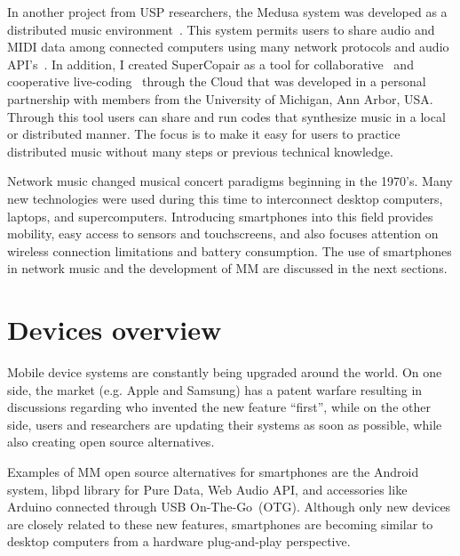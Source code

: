 In another project from USP researchers, the Medusa system was developed as a distributed music environment~\citep{Schiavoni2011medusa,Schiavoni2012network,Schiavoni2013network}.
This system permits users to share audio and MIDI data among connected computers using many network protocols and audio API's~\citep{Schiavoni2013thesis}.
In addition, I created SuperCopair as a tool for collaborative~\citep{deCarvalhoJunior2015supercopair} and cooperative live-coding~\citep{deCarvalhoJunior2015cooperative} through the Cloud that was developed in a personal partnership with members from the University of Michigan, Ann Arbor, USA.
Through this tool users can share and run codes that synthesize music in a local or distributed manner.
The focus is to make it easy for users to practice distributed music without many steps or previous technical knowledge.

Network music changed musical concert paradigms beginning in the 1970's.
Many new technologies were used during this time to interconnect desktop computers, laptops, and supercomputers.
Introducing smartphones into this field provides mobility, easy access to sensors and touchscreens, and also focuses attention on wireless connection limitations and battery consumption.
The use of smartphones in network music and the development of MM are discussed in the next sections.

\section{Devices overview}
\label{sec:mobiletechnologies}

Mobile device systems are constantly being upgraded around the world.
On one side, the market (e.g. Apple and Samsung) has a patent warfare resulting in discussions regarding who invented the new feature ``first'', while on the other side, users and researchers are updating their systems as soon as possible, while also creating open source alternatives.

Examples of MM open source alternatives for smartphones are the Android system, libpd library for Pure Data, Web Audio API, and accessories like Arduino connected through USB On-The-Go~(OTG).
Although only new devices are closely related to these new features, smartphones are becoming similar to desktop computers from a hardware plug-and-play perspective.

